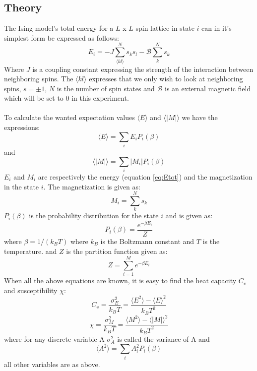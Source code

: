 \documentclass{article}
\begin{document}
\subsection*{Theory}
The Ising model's total energy for a $L$ x $L$  spin lattice in state $i$ can in it's simplest form be expressed as follows:
\begin{equation}
E_i = - J \sum\limits_{\langle kl \rangle}^N s_k s_l - \mathcal{B}\sum \limits_{k}^N s_k
\label{eq:Etot}
\end{equation}
Where $J$ is a coupling constant expressing the strength of the interaction between neighboring spins. The $\langle kl \rangle$ expresses that we only wish to look at neighboring spins, $s = \pm 1$, $N$ is the number of spin states and $\mathcal{B}$ is an external magnetic field which will be set to 0 in this experiment. \\ \\
To calculate the wanted expectation values $\langle E \rangle$ and $\langle |M| \rangle$ we have the expressions:
\begin{equation}
\langle E \rangle = \sum \limits_i E_i P_i(\beta)
\label{eq:Eexp}
\end{equation} 
and 
\begin{equation}
\langle |M| \rangle = \sum \limits_i |M_i| P_i(\beta)
\label{eq:Mexp}
\end{equation}
$E_i$ and $M_i$ are respectively the energy (equation \eqref{eq:Etot}) and the magnetization in the state $i$. The magnetization is given as:
\begin{equation}
M_i = \sum \limits_k^N s_k
\label{eq:Mtot}
\end{equation} 
$P_i(\beta)$ is the probability distribution for the state $i$ and is given as:
\begin{equation}
P_i(\beta) = \frac{e^{-\beta E_i}}{Z}
\label{eq:probdist}
\end{equation}
where $\beta = 1/(k_B T)$ where $k_B$ is the Boltzmann constant and $T$ is the temperature. and $Z$ is the partition function given as:
\begin{equation}
Z = \sum \limits_{i = 1}^M e^{- \beta E_i}
\label{eq:distribution}
\end{equation}
When all the above equations are known, it is easy to find the heat capacity $C_v$ and susceptibility $\chi$:
\begin{equation}
C_v = \frac{\sigma_E^2}{k_B T} = \frac{\langle E^2 \rangle - \langle E \rangle ^2}{k_B T^2}
\label{eq:heatc}
\end{equation}
\begin{equation}
\chi = \frac{\sigma_M^2}{k_B T} = \frac{\langle M^2 \rangle - \langle |M| \rangle ^2}{k_B T^2}
\label{eq:suscept}
\end{equation}
where for any discrete variable A $\sigma_A^2$ is called the variance of A and
\begin{equation}
\langle A^2 \rangle = \sum_i A_i^2 P_i(\beta)
\label{eq:var}
\end{equation}
all other variables are as above.
\end{document}
